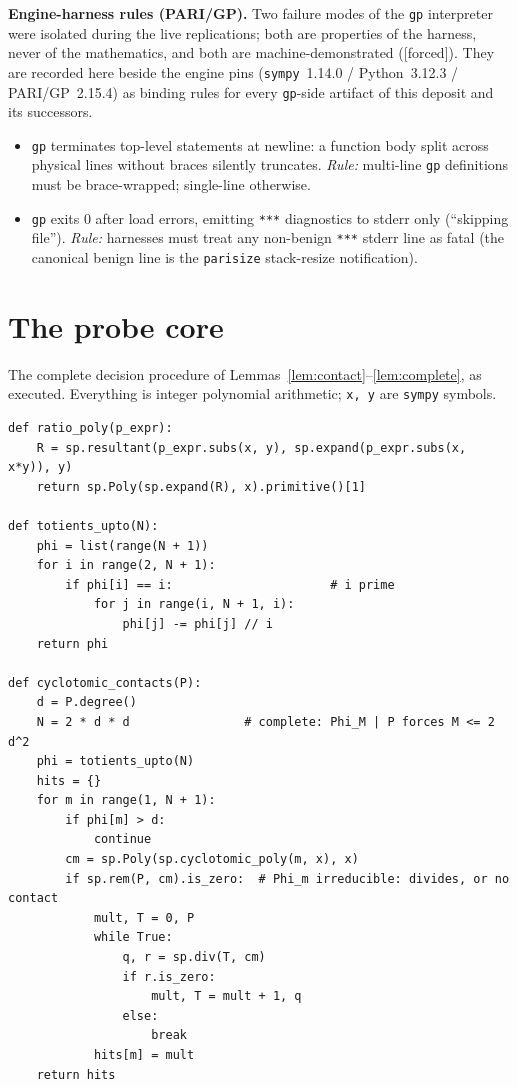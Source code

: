 \documentclass[11pt]{article}
\theoremstyle{plain}
\theoremstyle{definition}
\theoremstyle{remark}
\newcommand{\F}{\textnormal{[forced]}}
\begin{document}
\medskip
\noindent\textbf{Engine-harness rules (PARI/GP).}
Two failure modes of the \texttt{gp} interpreter were isolated during the
live replications; both are properties of the harness, never of the
mathematics, and both are machine-demonstrated (\F). They are recorded here
beside the engine pins (\texttt{sympy}~1.14.0 / Python~3.12.3 /
PARI/GP~2.15.4) as binding rules for every \texttt{gp}-side artifact of this
deposit and its successors.
\begin{itemize}
\item[\textbf{H1.}] \texttt{gp} terminates top-level statements at newline: a
function body split across physical lines without braces silently truncates.
\emph{Rule:} multi-line \texttt{gp} definitions must be brace-wrapped;
single-line otherwise.
\item[\textbf{H2.}] \texttt{gp} exits $0$ after load errors, emitting
\texttt{***} diagnostics to stderr only (``skipping file'').
\emph{Rule:} harnesses must treat any non-benign \texttt{***} stderr line as
fatal (the canonical benign line is the \texttt{parisize} stack-resize
notification).
\end{itemize}

\section{The probe core}\label{app:probe}

The complete decision procedure of
Lemmas~\ref{lem:contact}--\ref{lem:complete}, as executed. Everything is
integer polynomial arithmetic; \texttt{x, y} are \texttt{sympy} symbols.

\begin{verbatim}
def ratio_poly(p_expr):
    R = sp.resultant(p_expr.subs(x, y), sp.expand(p_expr.subs(x, x*y)), y)
    return sp.Poly(sp.expand(R), x).primitive()[1]

def totients_upto(N):
    phi = list(range(N + 1))
    for i in range(2, N + 1):
        if phi[i] == i:                      # i prime
            for j in range(i, N + 1, i):
                phi[j] -= phi[j] // i
    return phi

def cyclotomic_contacts(P):
    d = P.degree()
    N = 2 * d * d                # complete: Phi_M | P forces M <= 2 d^2
    phi = totients_upto(N)
    hits = {}
    for m in range(1, N + 1):
        if phi[m] > d:
            continue
        cm = sp.Poly(sp.cyclotomic_poly(m, x), x)
        if sp.rem(P, cm).is_zero:  # Phi_m irreducible: divides, or no contact
            mult, T = 0, P
            while True:
                q, r = sp.div(T, cm)
                if r.is_zero:
                    mult, T = mult + 1, q
                else:
                    break
            hits[m] = mult
    return hits
\end{verbatim}
\end{document}
